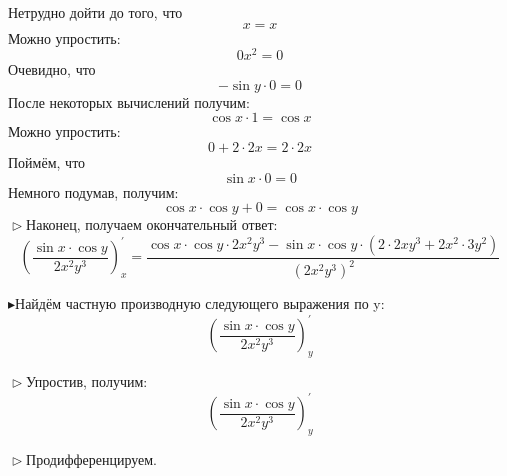 \documentclass[12pt]{article}
\begin{document}
Нетрудно дойти до того, что\begin{dmath*}
x = x
\end{dmath*}Можно упростить:\begin{dmath*}
0x^{2} = 0
\end{dmath*}Очевидно, что\begin{dmath*}
-\sin y \cdot 0 = 0
\end{dmath*}После некоторых вычислений получим:\begin{dmath*}
\cos x \cdot 1 = \cos x
\end{dmath*}Можно упростить:\begin{dmath*}
0 + 2 \cdot 2x = 2 \cdot 2x
\end{dmath*}Поймём, что\begin{dmath*}
\sin x \cdot 0 = 0
\end{dmath*}Немного подумав, получим:\begin{dmath*}
\cos x \cdot \cos y + 0 = \cos x \cdot \cos y
\end{dmath*}$\vartriangleright$Наконец, получаем окончательный ответ:
                             \begin{dmath*}
                             \left( \frac {\sin x \cdot \cos y} {2x^{2}y^{3}} \right)_{x}^{\prime} =  \frac {\cos x \cdot \cos y \cdot 2x^{2}y^{3} - \sin x \cdot \cos y \cdot \left(2 \cdot 2xy^{3} + 2x^{2} \cdot 3y^{2}\right)} {\left(2x^{2}y^{3}\right)^{2}} 
                             \end{dmath*}

$\blacktriangleright$Найдём частную производную следующего выражения по y:
                             \begin{dmath*}
                             \left( \frac {\sin x \cdot \cos y} {2x^{2}y^{3}} \right)_{y}^{\prime}
                             \end{dmath*}

$\vartriangleright$Упростив, получим: 
                             \begin{dmath*}
                             \left( \frac {\sin x \cdot \cos y} {2x^{2}y^{3}} \right)_{y}^{\prime}
                             \end{dmath*}

$\vartriangleright$Продифференцируем.
\end{document}
